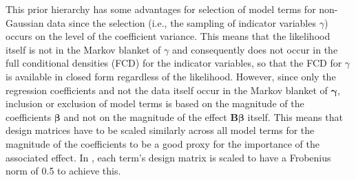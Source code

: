 \documentclass[article, shortnames, nojss, noheadings, notitle]{jss}
\begin{document}
This prior hierarchy has some advantages for selection of model terms for non-Gaussian data
since the selection (i.e., the sampling of indicator variables
$\gamma$) occurs on the level of the coefficient variance. This means that the likelihood itself is not in the
Markov blanket of $\gamma$ and consequently does not occur in the
full conditional densities (FCD) for the indicator variables, so that the FCD for $\gamma$ is available in closed form
regardless of the likelihood. However,
since only the regression coefficients and not the data itself occur in the Markov blanket
of $\bm\gamma$, inclusion or exclusion of model terms is based on the magnitude of the coefficients $\bm \beta$ and
not on the magnitude
of the effect $\bm{B \beta}$ itself. This means that design matrices have to be scaled similarly
across all model terms for the magnitude of the coefficients to be a good proxy for the importance of the associated effect.
In , each term's design matrix is scaled to have a Frobenius norm of 0.5 to achieve this.
\end{document}
